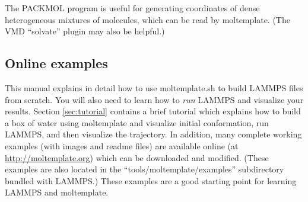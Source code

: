 \documentclass[11pt]{article}
\begin{document}
The PACKMOL \cite{packmol} program is useful for generating 
coordinates of dense heterogeneous mixtures of molecules,
which can be read by moltemplate.
(The VMD ``solvate'' plugin may also be helpful.)

\subsection*{Online examples}




This manual explains in detail how to use moltemplate.sh to build LAMMPS 
files from scratch.  
You will also need to learn how to \textit{run} 
LAMMPS and visualize your results.
Section \ref{sec:tutorial} contains a brief tutorial
which explains how to build a box of water using moltemplate and 
visualize initial conformation, run LAMMPS, and then visualize the trajectory. 
In addition, many complete working examples 
(with images and readme files) are available online 
  (at \url{http://moltemplate.org})
which can be downloaded and modified.  
(These examples are also located in the ``tools/moltemplate/examples'' 
 subdirectory bundled with LAMMPS.)
These examples are a good starting point for learning LAMMPS and moltemplate.
\end{document}
